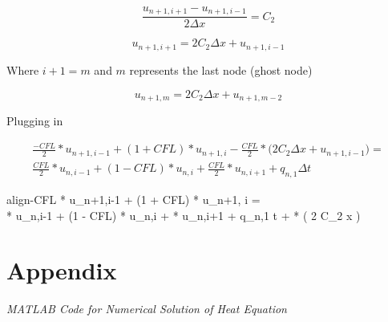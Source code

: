 \documentclass[10pt, letter, showtrims]{extarticle}
\newcommand{\boxedeq}[2]{\begin{empheq}[box={\fboxsep=6pt\fbox}]{align}\label{#1}#2\end{empheq}}
\begin{document}
    		\begin{equation}
    			\frac{u_{n+1,i+1} - u_{n+1,i-1}}{2 \Delta x} = C_{2}
    		\end{equation}
    		
    		\begin{equation}
    			u_{n+1,i+1} = 2 C_{2} \Delta x + u_{n+1,i-1}
    		\end{equation}
    		
    		\noindent
    		Where $i+1 = m$ and $m$ represents the last node (ghost node)
    		
    		\begin{equation}
    			u_{n+1,m} = 2 C_{2} \Delta x + u_{n+1,m-2}
    		\end{equation}
    		
    		\noindent
    		Plugging in
    		
    		\begin{equation}
    			\begin{split}
    			\frac{-CFL}{2} * u_{n+1,i-1} + (1 + CFL) * u_{n+1, i} - \frac{CFL}{2} * \big( 2 C_{2} \Delta x + u_{n+1,i-1} \big) = \\ 
    			\frac{CFL}{2} * u_{n,i-1} + (1 - CFL) * u_{n,i} + \frac{CFL}{2} * u_{n,i+1} + q_{n,1} \Delta t
    			\end{split}
    		\end{equation}
    		
    		\boxedeq{}{-CFL * u_{n+1,i-1} + (1 + CFL) * u_{n+1, i} = \\ 
    			\frac{CFL}{2} * u_{n,i-1} + (1 - CFL) * u_{n,i} + \frac{CFL}{2} * u_{n,i+1} + q_{n,1} \Delta t + \frac{CFL}{2} * \big( 2 C_{2} \Delta x \big)}
    		
		\pagebreak
		
		\pagebreak	
	
	\section{Appendix}
	
	\centerline{\textit{MATLAB Code for Numerical Solution of Heat Equation}}
	
	
\end{document}

